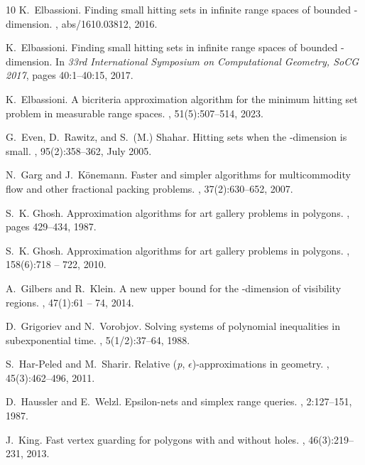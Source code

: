 \documentclass[a4paper,11pt]{article}
\begin{document}
\begin{thebibliography}{10}
	K.~Elbassioni.
	\newblock Finding small hitting sets in infinite range spaces of bounded
	-dimension.
	, abs/1610.03812, 2016.
	
	K.~Elbassioni.
	\newblock Finding small hitting sets in infinite range spaces of bounded
	-dimension.
	\newblock In {\em 33rd International Symposium on Computational Geometry, SoCG
		2017}, pages 40:1--40:15, 2017.
	
	K.~Elbassioni.
	\newblock A bicriteria approximation algorithm for the minimum hitting set
	problem in measurable range spaces.
	, 51(5):507--514, 2023.
	
	G.~Even, D.~Rawitz, and S.~(M.) Shahar.
	\newblock Hitting sets when the -dimension is small.
	, 95(2):358--362, July 2005.
	
	N.~Garg and J.~K{\"{o}}nemann.
	\newblock Faster and simpler algorithms for multicommodity flow and other
	fractional packing problems.
	, 37(2):630--652, 2007.
	
	S.~K. Ghosh.
	\newblock Approximation algorithms for art gallery problems in polygons.
	, pages 429--434,
	1987.
	
	S.~K. Ghosh.
	\newblock Approximation algorithms for art gallery problems in polygons.
	, 158(6):718 -- 722, 2010.
	
	A.~Gilbers and R.~Klein.
	\newblock A new upper bound for the -dimension of visibility regions.
	, 47(1):61 -- 74, 2014.
	
	D.~Grigoriev and N.~Vorobjov.
	\newblock Solving systems of polynomial inequalities in subexponential time.
	, 5(1/2):37--64, 1988.
	
	S.~Har{-}Peled and M.~Sharir.
	\newblock Relative (\emph{p}, \emph{{\(\epsilon\)}})-approximations in
	geometry.
	, 45(3):462--496, 2011.
	
	D.~Haussler and E.~Welzl.
	\newblock Epsilon-nets and simplex range queries.
	, 2:127--151, 1987.
	
	J.~King.
	\newblock Fast vertex guarding for polygons with and without holes.
	, 46(3):219--231, 2013.
	

\end{thebibliography}
\end{document}
